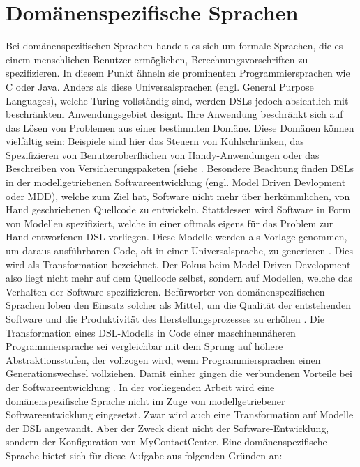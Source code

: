 \section{Domänenspezifische Sprachen}
Bei domänenspezifischen Sprachen handelt es sich um formale Sprachen, die es einem menschlichen Benutzer ermöglichen, Berechnungsvorschriften zu spezifizieren. In diesem Punkt ähneln sie prominenten Programmiersprachen wie C oder Java. Anders als diese Universalsprachen (engl. General Purpose Languages), welche Turing-vollständig sind, werden DSLs jedoch absichtlich mit beschränktem Anwendungsgebiet designt. Ihre Anwendung beschränkt sich auf das Lösen von Problemen aus einer bestimmten Domäne. Diese Domänen können vielfältig sein: Beispiele sind hier das Steuern von Kühlschränken, das Spezifizieren von Benutzeroberflächen von Handy-Anwendungen oder das Beschreiben von Versicherungspaketen (siehe \cite[S. 93ff.]{Kelly:08}. Besondere Beachtung finden DSLs in der modellgetriebenen Softwareentwicklung (engl. Model Driven Devlopment oder MDD), welche zum Ziel hat, Software nicht mehr über herkömmlichen, von Hand geschriebenen Quellcode zu entwickeln. Stattdessen wird Software in Form von Modellen spezifiziert, welche in einer oftmals eigens für das Problem zur Hand entworfenen DSL vorliegen. Diese Modelle werden als Vorlage genommen, um daraus ausführbaren Code, oft in einer  Universalsprache, zu generieren \cite[S. 29]{Voelter:13}. Dies wird als Transformation bezeichnet. Der Fokus beim Model Driven Development also liegt nicht mehr auf dem Quellcode selbst, sondern auf Modellen, welche das Verhalten der Software spezifizieren. Befürworter von domänenspezifischen Sprachen loben den Einsatz solcher als Mittel, um die Qualität der entstehenden Software und die Produktivität des Herstellungsprozesses zu erhöhen \cite[S. 33f]{Fowler:11}. Die Transformation eines DSL-Modells in Code einer maschinennäheren Programmiersprache sei vergleichbar mit dem Sprung auf höhere Abstraktionsstufen, der vollzogen wird, wenn Programmiersprachen einen Generationswechsel vollziehen. Damit einher gingen die verbundenen Vorteile bei der Softwareentwicklung \cite[S. 15ff]{Kelly:08}.
\newline
In der vorliegenden Arbeit wird eine domänenspezifische Sprache nicht im Zuge von modellgetriebener Softwareentwicklung eingesetzt. Zwar wird auch eine Transformation auf Modelle der DSL angewandt. Aber der Zweck dient nicht der Software-Entwicklung, sondern der Konfiguration von MyContactCenter. Eine domänenspezifische Sprache bietet sich für diese Aufgabe aus folgenden Gründen an: 
